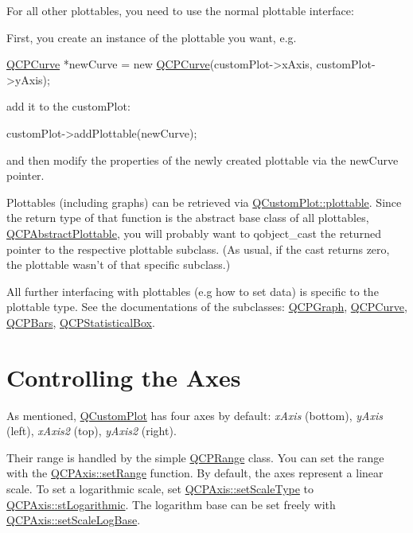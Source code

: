 For all other plottables, you need to use the normal plottable interface\-:\par
 First, you create an instance of the plottable you want, e.\-g. 
\begin{DoxyCode}
\hyperlink{class_q_c_p_curve}{QCPCurve} *newCurve = \textcolor{keyword}{new} \hyperlink{class_q_c_p_curve}{QCPCurve}(customPlot->xAxis, customPlot->yAxis);
\end{DoxyCode}
 add it to the custom\-Plot\-: 
\begin{DoxyCode}
customPlot->addPlottable(newCurve);
\end{DoxyCode}
 and then modify the properties of the newly created plottable via the {\ttfamily new\-Curve} pointer.

Plottables (including graphs) can be retrieved via \hyperlink{class_q_custom_plot_a32de81ff53e263e785b83b52ecd99d6f}{Q\-Custom\-Plot\-::plottable}. Since the return type of that function is the abstract base class of all plottables, \hyperlink{class_q_c_p_abstract_plottable}{Q\-C\-P\-Abstract\-Plottable}, you will probably want to qobject\-\_\-cast the returned pointer to the respective plottable subclass. (As usual, if the cast returns zero, the plottable wasn't of that specific subclass.)

All further interfacing with plottables (e.\-g how to set data) is specific to the plottable type. See the documentations of the subclasses\-: \hyperlink{class_q_c_p_graph}{Q\-C\-P\-Graph}, \hyperlink{class_q_c_p_curve}{Q\-C\-P\-Curve}, \hyperlink{class_q_c_p_bars}{Q\-C\-P\-Bars}, \hyperlink{class_q_c_p_statistical_box}{Q\-C\-P\-Statistical\-Box}.\hypertarget{index_mainpage-axes}{}\section{Controlling the Axes}\label{index_mainpage-axes}
As mentioned, \hyperlink{class_q_custom_plot}{Q\-Custom\-Plot} has four axes by default\-: {\itshape x\-Axis} (bottom), {\itshape y\-Axis} (left), {\itshape x\-Axis2} (top), {\itshape y\-Axis2} (right).

Their range is handled by the simple \hyperlink{class_q_c_p_range}{Q\-C\-P\-Range} class. You can set the range with the \hyperlink{class_q_c_p_axis_aebdfea5d44c3a0ad2b4700cd4d25b641}{Q\-C\-P\-Axis\-::set\-Range} function. By default, the axes represent a linear scale. To set a logarithmic scale, set \hyperlink{class_q_c_p_axis_adb6c5c45bdf899ea221881dd3b43b406}{Q\-C\-P\-Axis\-::set\-Scale\-Type} to \hyperlink{class_q_c_p_axis_a36d8e8658dbaa179bf2aeb973db2d6f0abf5b785ad976618816dc6f79b73216d4}{Q\-C\-P\-Axis\-::st\-Logarithmic}. The logarithm base can be set freely with \hyperlink{class_q_c_p_axis_a726186054be90487885a748aa1b42188}{Q\-C\-P\-Axis\-::set\-Scale\-Log\-Base}.


